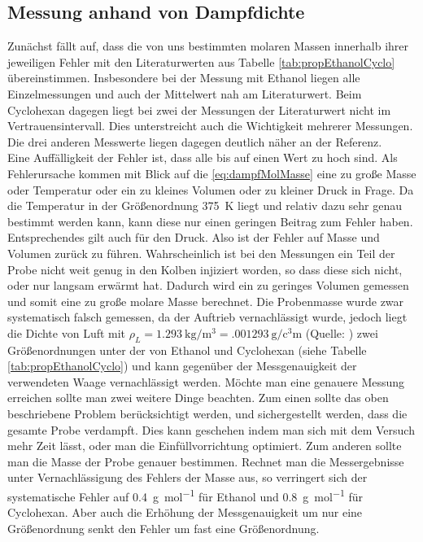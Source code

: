 \subsection{Messung anhand von Dampfdichte}
Zunächst fällt auf, dass die von uns bestimmten molaren Massen innerhalb ihrer jeweiligen Fehler mit den Literaturwerten aus Tabelle \ref{tab:propEthanolCyclo} übereinstimmen. Insbesondere bei der Messung mit Ethanol liegen alle Einzelmessungen und auch der Mittelwert nah am Literaturwert. Beim Cyclohexan dagegen liegt bei zwei der Messungen der Literaturwert nicht im Vertrauensintervall. Dies unterstreicht auch die Wichtigkeit mehrerer Messungen. Die drei anderen Messwerte liegen dagegen deutlich näher an der Referenz.\\
Eine Auffälligkeit der Fehler ist, dass alle bis auf einen Wert zu hoch sind. Als Fehlerursache kommen mit Blick auf die \eqref{eq:dampfMolMasse} eine zu große Masse oder Temperatur oder ein zu kleines Volumen oder zu kleiner Druck in Frage. Da die Temperatur in der Größenordnung \SI{375}{\K} liegt und relativ dazu sehr genau bestimmt werden kann, kann diese nur einen geringen Beitrag zum Fehler haben. Entsprechendes gilt auch für den Druck.
Also ist der Fehler auf Masse und Volumen zurück zu führen. Wahrscheinlich ist bei den Messungen ein Teil der Probe nicht weit genug in den Kolben injiziert worden, so dass diese sich nicht, oder nur langsam erwärmt hat. Dadurch wird ein zu geringes Volumen gemessen und somit eine zu große molare Masse berechnet. Die Probenmasse wurde zwar systematisch falsch gemessen, da der Auftrieb vernachlässigt wurde, jedoch liegt die Dichte von Luft mit $ \rho_L = \SI{1,293}{\kilo\g\per\cubic\meter} = \SI{,001293}{\g\per\cubic\centi\m} $ (Quelle: \cite{wiki:luft}) zwei Größenordnungen unter der von Ethanol und Cyclohexan (siehe Tabelle \ref{tab:propEthanolCyclo}) und kann gegenüber der Messgenauigkeit der verwendeten Waage vernachlässigt werden.
Möchte man eine genauere Messung erreichen sollte man zwei weitere Dinge beachten. Zum einen sollte das oben beschriebene Problem berücksichtigt werden, und sichergestellt werden, dass die gesamte Probe verdampft. Dies kann geschehen indem man sich mit dem Versuch mehr Zeit lässt, oder man die Einfüllvorrichtung optimiert. Zum anderen sollte man die Masse der Probe genauer bestimmen. Rechnet man die Messergebnisse unter Vernachlässigung des Fehlers der Masse aus, so verringert sich der systematische Fehler auf \SI{.4}{\g\per\mol} für Ethanol und \SI{.8}{\g\per\mol} für Cyclohexan. Aber auch die Erhöhung der Messgenauigkeit um nur eine Größenordnung senkt den Fehler um fast eine Größenordnung.